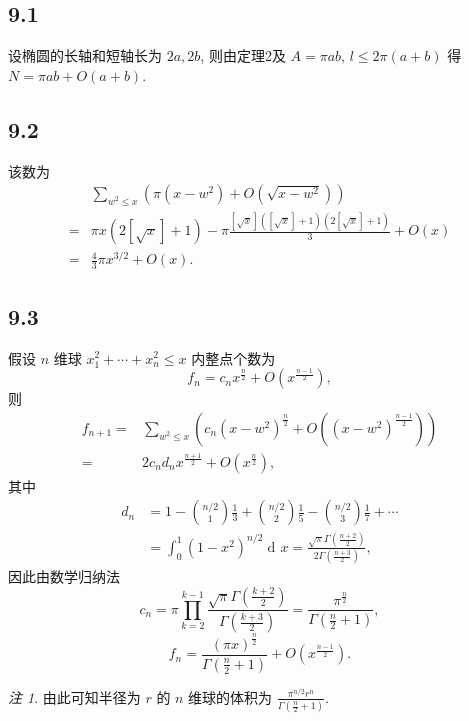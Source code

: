\documentclass[12pt,a4paper,reqno]{amsart}
\theoremstyle{remark}
\newtheorem{remark}[thm]{注}
\renewcommand{\le}{\leqslant}
\DeclareMathOperator{\ud}{\mathrm{d\!}}
\begin{document}
\subsection*{9.1}
设椭圆的长轴和短轴长为 $2a,2b$, 则由定理2及 $A=\pi ab$, $l\le 2\pi(a+b)$ 得 $N=\pi ab+O(a+b)$.

\subsection*{9.2}
该数为
  \[\begin{split}
     &\sum_{w^2\le x} (\pi (x-w^2)+O(\sqrt{x-w^2}))\\
    =&\pi x(2[\sqrt{x}]+1)-\pi \frac{[\sqrt{x}]([\sqrt{x}]+1)(2[\sqrt{x}]+1)}{3}+O(x)\\
    =&\frac{4}{3}\pi x^{3/2}+O(x).
  \end{split}\]

\subsection*{9.3}
假设 $n$ 维球 $x_1^2+\cdots+x_n^2\le x$ 内整点个数为 \[f_n=c_n x^{\frac{n}{2}}+O(x^{\frac{n-1}{2}}),\]
则
  \[\begin{split}
    f_{n+1} =&\sum_{w^2\le x} (c_n(x-w^2)^{\frac{n}{2}}+O((x-w^2)^{\frac{n-1}{2}}))\\
    =&2c_nd_n  x^{\frac{n+1}{2}}+O(x^{\frac{n}{2}}),
  \end{split}\]
其中
  \[\begin{split}
    d_n&=1-{n/2\choose 1}\frac{1}{3}+{n/2\choose 2}\frac{1}{5}-{n/2\choose 3}\frac{1}{7}+\cdots\\
    &=\int_0^1 (1-x^2)^{n/2}\ud x=\frac{\sqrt{\pi} \Gamma(\frac{n+2}{2})}{2\Gamma(\frac{n+3}{2})},
  \end{split}\]
因此由数学归纳法
  \[c_n=\pi \prod_{k=2}^{k-1} \frac{\sqrt{\pi}\Gamma(\frac{k+2}{2})}{\Gamma(\frac{k+3}{2})}=\frac{\pi^{\frac{n}{2}}}{\Gamma(\frac{n}{2}+1)},\]
   \[f_n=\frac{(\pi x)^{\frac{n}{2}}}{\Gamma(\frac{n}{2}+1)}+O(x^{\frac{n-1}{2}}).\]
\begin{remark}
由此可知半径为 $r$ 的 $n$ 维球的体积为 $\frac{\pi^{n/2}r^n}{\Gamma(\frac{n}{2}+1)}$.
\end{remark}
\end{document}
